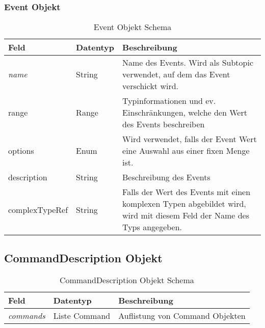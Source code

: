 \subsubsection{Event Objekt}
\begin{table}[H]
\begin{tabularx}{\textwidth}{|l|l|X|}

 \hline
 {\bf Feld } & {\bf Datentyp } & {\bf Beschreibung } \\  \hline
 
 \textit{name}  &   String   &  Name des Events. Wird als Subtopic verwendet, auf dem das Event verschickt wird. \\ \hline
 range  &   Range   &  Typinformationen und ev. Einschränkungen, welche den Wert des Events beschreiben   \\ \hline
 options  &   Enum   &  Wird verwendet, falls der Event Wert eine Auswahl aus einer fixen Menge ist.  \\ \hline
 description  &   String   &  Beschreibung des Events  \\ \hline
 complexTypeRef  &   String   &  Falls der Wert des Events mit einen komplexen Typen abgebildet wird, wird mit diesem Feld der Name des Typs angegeben.  \\ \hline

\end{tabularx}
\caption{Event Objekt Schema}
\end{table}



\subsection{CommandDescription Objekt}
\begin{table}[H]
\begin{tabularx}{\textwidth}{|l|l|X|}

 \hline
 {\bf Feld } & {\bf Datentyp } & {\bf Beschreibung } \\  \hline
 \textit{commands}  &   Liste Command   & Auflistung von Command Objekten   \\ \hline

\end{tabularx}
\caption{CommandDescription Objekt Schema}
\end{table}


